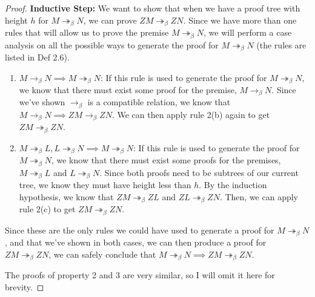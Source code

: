 \documentclass[a4paper,11pt]{article}
\theoremstyle{definition}
\theoremstyle{example}
\theoremstyle{lemma}
\newcommand{\lcalc}{\lambda\text{-calculus}}
\newcommand{\ssbr}{\rightarrow_{\beta}}
\newcommand{\msbr}{\twoheadrightarrow_{\beta}}
\begin{document}
\begin{proof}
\textbf{Inductive Step: }We want to show that when we have a proof tree with height $h$ for $M \msbr N$, we can prove $ZM \msbr ZN$. Since we have more than one rules that will allow us to prove the premise $M \msbr N$, we will perform a case analysis on all the possible ways to generate the proof for $M \msbr N$ (the rules are listed in Def 2.6).
\begin{enumerate}[topsep=2pt,itemsep=-0.5ex,partopsep=1ex,parsep=1ex]
    \item $M \ssbr N \implies M \msbr N$: If this rule is used to generate the proof for $M \msbr N$, we know that there must exist some proof for the premise, $M \ssbr N$. Since we've shown $\ssbr$ is a compatible relation, we know that $M \ssbr N \implies ZM \ssbr ZN$. We can then apply rule 2(b) again to get $ZM \msbr ZN$. 
    \item $M \msbr L, L \msbr N \implies M \msbr N$: If this rule is used to generate the proof for $M \msbr N$, we know that there must exist some proofs for the premises, $M \msbr L$ and $L \msbr N$. Since both proofs need to be subtrees of our current tree, we know they must have height less than $h$. By the induction hypothesis, we know that $ZM \msbr ZL$ and $ZL \msbr ZN$. Then, we can apply rule 2(c) to get $ZM \msbr ZN$.
\end{enumerate}
Since these are the only rules we could have used to generate a proof for $M \msbr N$, and that we've shown in both cases, we can then produce a proof for $ZM \msbr ZN$, we can safely conclude that $M \msbr N \implies ZM \msbr ZN$.

The proofs of property 2 and 3 are very similar, so I will omit it here for brevity.
\end{proof}




\end{document}
